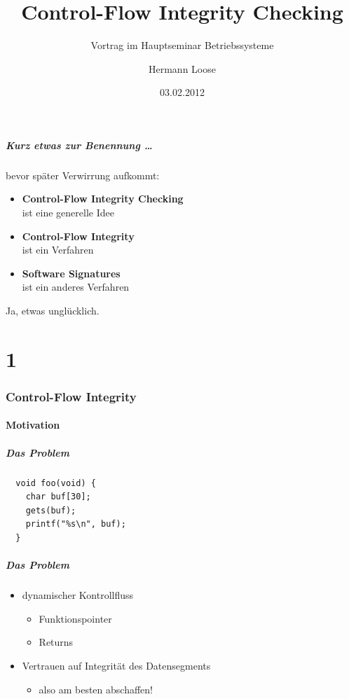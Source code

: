 \documentclass[mathserif,slidestop,compress,red]{beamer}
\title{Control-Flow Integrity Checking}
\subtitle{Vortrag im Hauptseminar Betriebssysteme}
\author{Hermann Loose}
\date{03.02.2012}
\begin{document}
\lstset{
  language=[x86masm]Assembler,
  basicstyle=\ttfamily
}

\frame[plain]{\titlepage}

\begin{frame}
  \frametitle{Kurz etwas zur Benennung …}
  bevor später Verwirrung aufkommt:
  \begin{itemize}
    \item \textbf{Control-Flow Integrity Checking} \\ ist eine generelle Idee %
    \item \textbf{Control-Flow Integrity} \\ ist ein Verfahren %
    \item \textbf{Software Signatures} \\ ist ein anderes Verfahren
  \end{itemize}
  \begin{flushright}
    Ja, etwas unglücklich.
  \end{flushright}
\end{frame}

\part{1}
\section{Control-Flow Integrity}

\subsection{Motivation}

\begin{frame}[fragile]
  \frametitle{Das Problem}
  \begin{lstlisting}
  void foo(void) {
    char buf[30];
    gets(buf);
    printf("%s\n", buf);
  }
  \end{lstlisting}
\end{frame}

\begin{frame}
  \frametitle{Das Problem}
  \begin{itemize}
    \item dynamischer Kontrollfluss
    \begin{itemize}
      \item Funktionspointer
      \item Returns
    \end{itemize}
    \item Vertrauen auf Integrität des Datensegments
    \begin{itemize}
      \pause
      \item also am besten abschaffen!
    \end{itemize}
  \end{itemize}
\end{frame}
\end{document}
